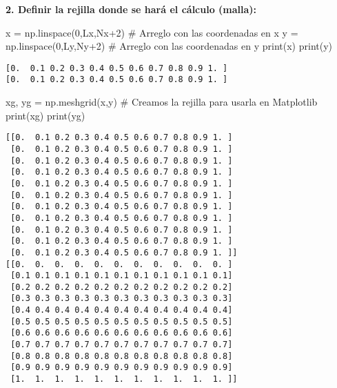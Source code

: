 \documentclass[
  letterpaper,
  DIV=11,
  numbers=noendperiod]{scrreprt}
\newenvironment{Shaded}{\begin{snugshade}}{\end{snugshade}}
\newcommand{\BuiltInTok}[1]{\textcolor[rgb]{0.00,0.23,0.31}{#1}}
\newcommand{\CommentTok}[1]{\textcolor[rgb]{0.37,0.37,0.37}{#1}}
\newcommand{\DecValTok}[1]{\textcolor[rgb]{0.68,0.00,0.00}{#1}}
\newcommand{\NormalTok}[1]{\textcolor[rgb]{0.00,0.23,0.31}{#1}}
\newcommand{\OperatorTok}[1]{\textcolor[rgb]{0.37,0.37,0.37}{#1}}
\begin{document}
\textbf{2. Definir la rejilla donde se hará el cálculo (malla):}

\begin{Shaded}
\begin{Highlighting}[]
\NormalTok{x }\OperatorTok{=}\NormalTok{ np.linspace(}\DecValTok{0}\NormalTok{,Lx,Nx}\OperatorTok{+}\DecValTok{2}\NormalTok{) }\CommentTok{\# Arreglo con las coordenadas en x}
\NormalTok{y }\OperatorTok{=}\NormalTok{ np.linspace(}\DecValTok{0}\NormalTok{,Ly,Ny}\OperatorTok{+}\DecValTok{2}\NormalTok{) }\CommentTok{\# Arreglo con las coordenadas en y}
\BuiltInTok{print}\NormalTok{(x)}
\BuiltInTok{print}\NormalTok{(y)}
\end{Highlighting}
\end{Shaded}

\begin{verbatim}
[0.  0.1 0.2 0.3 0.4 0.5 0.6 0.7 0.8 0.9 1. ]
[0.  0.1 0.2 0.3 0.4 0.5 0.6 0.7 0.8 0.9 1. ]
\end{verbatim}

\begin{Shaded}
\begin{Highlighting}[]
\NormalTok{xg, yg }\OperatorTok{=}\NormalTok{ np.meshgrid(x,y) }\CommentTok{\# Creamos la rejilla para usarla en Matplotlib}
\BuiltInTok{print}\NormalTok{(xg)}
\BuiltInTok{print}\NormalTok{(yg)}
\end{Highlighting}
\end{Shaded}

\begin{verbatim}
[[0.  0.1 0.2 0.3 0.4 0.5 0.6 0.7 0.8 0.9 1. ]
 [0.  0.1 0.2 0.3 0.4 0.5 0.6 0.7 0.8 0.9 1. ]
 [0.  0.1 0.2 0.3 0.4 0.5 0.6 0.7 0.8 0.9 1. ]
 [0.  0.1 0.2 0.3 0.4 0.5 0.6 0.7 0.8 0.9 1. ]
 [0.  0.1 0.2 0.3 0.4 0.5 0.6 0.7 0.8 0.9 1. ]
 [0.  0.1 0.2 0.3 0.4 0.5 0.6 0.7 0.8 0.9 1. ]
 [0.  0.1 0.2 0.3 0.4 0.5 0.6 0.7 0.8 0.9 1. ]
 [0.  0.1 0.2 0.3 0.4 0.5 0.6 0.7 0.8 0.9 1. ]
 [0.  0.1 0.2 0.3 0.4 0.5 0.6 0.7 0.8 0.9 1. ]
 [0.  0.1 0.2 0.3 0.4 0.5 0.6 0.7 0.8 0.9 1. ]
 [0.  0.1 0.2 0.3 0.4 0.5 0.6 0.7 0.8 0.9 1. ]]
[[0.  0.  0.  0.  0.  0.  0.  0.  0.  0.  0. ]
 [0.1 0.1 0.1 0.1 0.1 0.1 0.1 0.1 0.1 0.1 0.1]
 [0.2 0.2 0.2 0.2 0.2 0.2 0.2 0.2 0.2 0.2 0.2]
 [0.3 0.3 0.3 0.3 0.3 0.3 0.3 0.3 0.3 0.3 0.3]
 [0.4 0.4 0.4 0.4 0.4 0.4 0.4 0.4 0.4 0.4 0.4]
 [0.5 0.5 0.5 0.5 0.5 0.5 0.5 0.5 0.5 0.5 0.5]
 [0.6 0.6 0.6 0.6 0.6 0.6 0.6 0.6 0.6 0.6 0.6]
 [0.7 0.7 0.7 0.7 0.7 0.7 0.7 0.7 0.7 0.7 0.7]
 [0.8 0.8 0.8 0.8 0.8 0.8 0.8 0.8 0.8 0.8 0.8]
 [0.9 0.9 0.9 0.9 0.9 0.9 0.9 0.9 0.9 0.9 0.9]
 [1.  1.  1.  1.  1.  1.  1.  1.  1.  1.  1. ]]
\end{verbatim}
\end{document}
